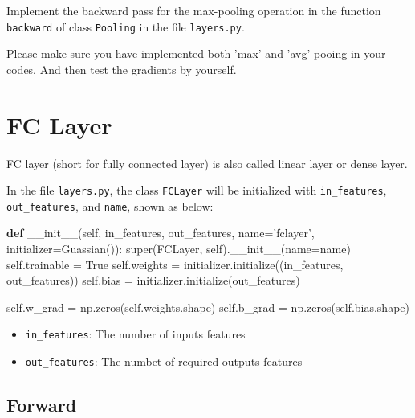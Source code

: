 \documentclass[11pt]{article}
\providecommand{\tightlist}{%
      \setlength{\itemsep}{0pt}\setlength{\parskip}{0pt}}
\newenvironment{Shaded}{}{}
\newcommand{\KeywordTok}[1]{\textcolor[rgb]{0.00,0.44,0.13}{\textbf{{#1}}}}
\newcommand{\StringTok}[1]{\textcolor[rgb]{0.25,0.44,0.63}{{#1}}}
\newcommand{\FunctionTok}[1]{\textcolor[rgb]{0.02,0.16,0.49}{{#1}}}
\newcommand{\NormalTok}[1]{{#1}}
\newcommand{\VariableTok}[1]{\textcolor[rgb]{0.10,0.09,0.49}{{#1}}}
\newcommand{\OperatorTok}[1]{\textcolor[rgb]{0.40,0.40,0.40}{{#1}}}
\newcommand{\BuiltInTok}[1]{{#1}}
\begin{document}
Implement the backward pass for the max-pooling operation in the
function \texttt{backward} of class \texttt{Pooling} in the file
\texttt{layers.py}.

Please make sure you have implemented both 'max' and 'avg' pooing in
your codes. And then test the gradients by yourself.

    \section{FC Layer}\label{fc-layer}

FC layer (short for fully connected layer) is also called linear layer
or dense layer.

In the file \texttt{layers.py}, the class \texttt{FCLayer} will be
initialized with \texttt{in\_features}, \texttt{out\_features}, and
\texttt{name}, shown as below:

\begin{Shaded}
\begin{Highlighting}[]
\KeywordTok{def} \FunctionTok{__init__}\NormalTok{(}\VariableTok{self}\NormalTok{, in_features, out_features, name}\OperatorTok{=}\StringTok{'fclayer'}\NormalTok{, initializer}\OperatorTok{=}\NormalTok{Guassian()):}
        \BuiltInTok{super}\NormalTok{(FCLayer, }\VariableTok{self}\NormalTok{).}\FunctionTok{__init__}\NormalTok{(name}\OperatorTok{=}\NormalTok{name)}
        \VariableTok{self}\NormalTok{.trainable }\OperatorTok{=} \VariableTok{True}
        \VariableTok{self}\NormalTok{.weights }\OperatorTok{=}\NormalTok{ initializer.initialize((in_features, out_features))}
        \VariableTok{self}\NormalTok{.bias }\OperatorTok{=}\NormalTok{ initializer.initialize(out_features)}

        \VariableTok{self}\NormalTok{.w_grad }\OperatorTok{=}\NormalTok{ np.zeros(}\VariableTok{self}\NormalTok{.weights.shape)}
        \VariableTok{self}\NormalTok{.b_grad }\OperatorTok{=}\NormalTok{ np.zeros(}\VariableTok{self}\NormalTok{.bias.shape)}
\end{Highlighting}
\end{Shaded}

\begin{itemize}
\tightlist
\item
  \texttt{in\_features}: The number of inputs features
\item
  \texttt{out\_features}: The numbet of required outputs features
\end{itemize}

    \subsection{Forward}\label{forward}
\end{document}
